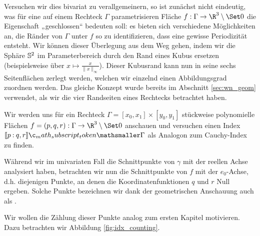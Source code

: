 \documentclass{mythesis}
\begin{document}
Versuchen wir dies bivariat zu verallgemeinern, so ist zunächst nicht eindeutig, was für eine auf einem Rechteck $\Gamma$ parametrisieren Fläche $f: \Gamma \to \R^3 \setminus \Set 0$ die Eigenschaft „geschlossen“ bedeuten soll: es bieten sich verschiedene Möglichkeiten an, die Ränder von $\Gamma$ unter $f$ so zu identifizieren, dass eine gewisse Periodizität entsteht.
Wir können dieser Überlegung aus dem Weg gehen, indem wir die Sphäre $\S^2$ im Parameterbereich durch den Rand eines Kubus ersetzen (beispielsweise über $x \mapsto \frac{x}{\|x\|_\infty}$).
Dieser Kubusrand kann nun in seine sechs Seitenflächen zerlegt werden, welchen wir einzelnd einen Abbildungsgrad zuordnen werden.
Das gleiche Konzept wurde bereits im Abschnitt \ref{sec:wn_geom} verwendet, als wir die vier Randseiten eines Rechtecks betrachtet haben.

Wir werden uns für ein Rechteck $\Gamma = [x_0,x_1] \times [y_0,y_1]$ stückweise polynomielle Flächen $f = (p,q,r): \Gamma \to \R^3 \setminus \Set 0$ anschauen und versuchen einen Index $\Index{\Gamma}{p}{q,r}$ als Analogon zum Cauchy-Index zu finden.

Während wir im univariaten Fall die Schnittpunkte von $\gamma$ mit der reellen Achse analysiert haben, betrachten wir nun die Schnittpunkte von $f$ mit der $e_0$-Achse, d.h. diejenigen Punkte, an denen die Koordinatenfunktionen $q$ und $r$ Null ergeben.
Solche Punkte bezeichnen wir dank der geometrischen Anschauung auch als .

Wir wollen die Zählung dieser Punkte analog zum ersten Kapitel motivieren.
Dazu betrachten wir Abbildung \ref{fig:idx_counting}.
\end{document}
